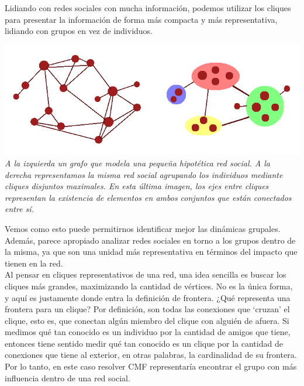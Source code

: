 Lidiando con redes sociales con mucha información, podemos utilizar los cliques para presentar la información de forma más compacta y más representativa, lidiando con grupos en vez de individuos. \\

\vspace{-1cm}
\begin{center}
	\includegraphics[scale=0.9]{informe/imgs/example.png}
	\textit{A la izquierda un grafo que modela una pequeña hipotética red social. A la derecha representamos la misma red social agrupando los individuos mediante cliques disjuntos maximales. En esta última imagen, los ejes entre cliques representan la existencia de elementos en ambos conjuntos que están conectados entre sí.}
\end{center}

Vemos como esto puede permitirnos identificar mejor las dinámicas grupales. Además, parece apropiado analizar redes sociales en torno a los grupos dentro de la misma, ya que son una unidad más representativa en términos del impacto que tienen en la red. \\

Al pensar en cliques representativos de una red, una idea sencilla es buscar los cliques más grandes, maximizando la cantidad de vértices. No es la única forma, y aquí es justamente donde entra la definición de frontera. ¿Qué representa una frontera para un clique? Por definición, son todas las conexiones que `cruzan' el clique, esto es, que conectan algún miembro del clique con alguién de afuera. Si medimos qué tan conocido es un individuo por la cantidad de amigos que tiene, entonces tiene sentido medir qué tan conocido es un clique por la cantidad de conexiones que tiene al exterior, en otras palabras, la cardinalidad de su frontera. Por lo tanto, en este caso resolver CMF representaría encontrar el grupo con más influencia dentro de una red social. \\

